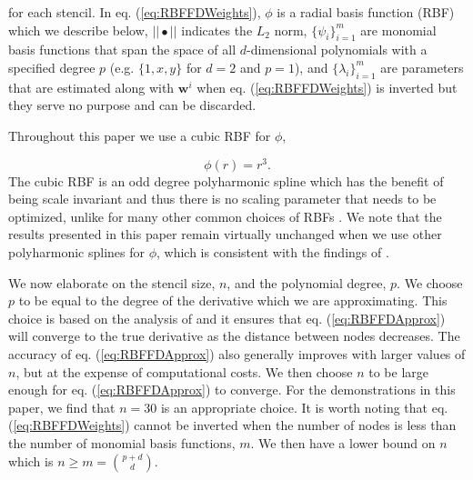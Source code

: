 \documentclass[10pt,a4paper]{article}
\begin{document}
for each stencil. In eq. (\ref{eq:RBFFDWeights}), $\phi$ is a radial basis function (RBF) which we describe below, $||\bullet||$ indicates the $L_2$ norm, $\{\psi_i\}_{i=1}^m$ are monomial basis functions that span the space of all $d$-dimensional polynomials with a specified degree $p$ (e.g. $\{1, x, y\}$ for $d=2$ and $p=1$), and $\{\lambda_i\}_{i=1}^m$ are parameters that are estimated along with $\mathbf{w}^i$ when eq. (\ref{eq:RBFFDWeights}) is inverted but they serve no purpose and can be discarded. 

Throughout this paper we use a cubic RBF for $\phi$,

\begin{equation}\label{eq:Cubic}
\phi(r) = r^3.
\end{equation}
The cubic RBF is an odd degree polyharmonic spline which has the benefit of being scale invariant and thus there is no scaling parameter that needs to be optimized, unlike for many other common choices of RBFs \citep[e.g.][]{Larsson2003}.  We note that the results presented in this paper remain virtually unchanged when we use other polyharmonic splines for $\phi$, which is consistent with the findings of \citet{Flyer2016}. 

We now elaborate on the stencil size, $n$, and the polynomial degree, $p$.  We choose $p$ to be equal to the degree of the derivative which we are approximating. This choice is based on the analysis of \citet{Flyer2016} and it ensures that eq. (\ref{eq:RBFFDApprox}) will converge to the true derivative as the distance between nodes decreases. The accuracy of eq. (\ref{eq:RBFFDApprox}) also generally improves with larger values of $n$, but at the expense of computational costs. We then choose $n$ to be large enough for eq. (\ref{eq:RBFFDApprox}) to converge. For the demonstrations in this paper, we find that $n=30$ is an appropriate choice.  It is worth noting that eq. (\ref{eq:RBFFDWeights}) cannot be inverted when the number of nodes is less than the number of monomial basis functions, $m$.  We then have a lower bound on $n$ which is $n \ge m = {{p+d}\choose{d}}$.   
\end{document}

